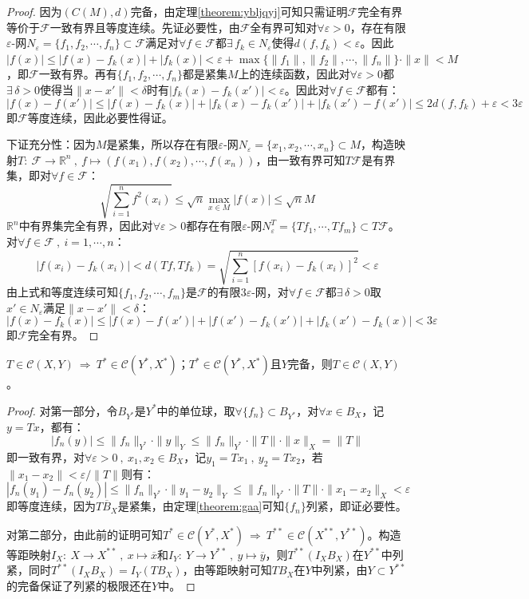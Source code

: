 \begin{proof}
因为$(C(M),d)$完备，由定理\ref{theorem:ybljqyj}可知只需证明$\mathscr{F}$完全有界等价于$\mathscr{F}$一致有界且等度连续。先证必要性，由$\mathscr{F}$全有界可知对$\forall \varepsilon>0$，存在有限$\varepsilon$-网$N_{\varepsilon}=\{f_1,f_2,\cdots,f_n\} \subset \mathscr{F}$满足对$\forall f \in \mathscr{F}$都$\exists \, f_k \in N_{\varepsilon}$使得$d(f,f_k)<\varepsilon$。因此$|f(x)|\leq |f(x)-f_k(x)|+|f_k(x)|<\varepsilon+\max\{\|f_1\|,\|f_2\|,\cdots,\|f_n\|\}\cdot\|x\|<M$，即$\mathscr{F}$一致有界。再有$\{f_1,f_2,\cdots,f_n\}$都是紧集$M$上的连续函数，因此对$\forall \varepsilon>0$都$\exists \, \delta>0$使得当$\|x-x'\|<\delta$时有$|f_k(x)-f_k(x')|<\varepsilon$。因此对$\forall f \in \mathscr{F}$都有：
\[|f(x)-f(x')|\leq|f(x)-f_k(x)|+|f_k(x)-f_k(x')|+|f_k(x')-f(x')|\leq 2d(f,f_k)+\varepsilon<3\varepsilon\]
即$\mathscr{F}$等度连续，因此必要性得证。

下证充分性：因为$M$是紧集，所以存在有限$\varepsilon$-网$N_{\varepsilon}=\{x_1,x_2,\cdots,x_n\} \subset M$，构造映射$T: \ \mathscr{F} \to \mathbb{R}^n \ , \ f \mapsto (f(x_1),f(x_2),\cdots,f(x_n))$，由一致有界可知$T\mathscr{F}$是有界集，即对$\forall f \in \mathscr{F}$：
\[\sqrt{\sum_{i=1}^nf^2(x_i)} \leq \sqrt{n}\max_{x \in M}|f(x)| \leq \sqrt{n}M\]
$\mathbb{R}^n$中有界集完全有界，因此对$\forall \varepsilon>0$都存在有限$\varepsilon$-网$N_{\varepsilon}^T=\{Tf_1,\cdots,Tf_m\} \subset T\mathscr{F}$。对$\forall f \in \mathscr{F} \ , \ i=1,\cdots,n$：
\[|f(x_i)-f_k(x_i)|<d(Tf,Tf_k)=\sqrt{\sum_{i=1}^n[f(x_i)-f_k(x_i)]^2}<\varepsilon\]
由上式和等度连续可知$\{f_1,f_2,\cdots,f_m\}$是$\mathscr{F}$的有限$3\varepsilon$-网，对$\forall f \in \mathscr{F}$都$\exists \, \delta>0 $取$x'\in N_{\varepsilon}$满足$\|x-x'\|<\delta$：
\[|f(x)-f_k(x)|\leq|f(x)-f(x')|+|f(x')-f_k(x')|+|f_k(x')-f_k(x)|<3\varepsilon\]
即$\mathscr{F}$完全有界。
\end{proof}

\begin{theorem}[Schauder 定理]\label{theorem:Schauder}
$T \in \mathscr{C}(X,Y) \ \Rightarrow \ T^* \in \mathscr{C}(Y^*,X^*)$；$T^* \in \mathscr{C}(Y^*,X^*)$且$Y$完备，则$T \in \mathscr{C}(X,Y)$。
\end{theorem}
\begin{proof}
对第一部分，令$B_{Y^*}$是$Y^*$中的单位球，取$\forall \{f_n\} \subset B_{Y^*}$，对$\forall x \in  B_{X}$，记$y=Tx$，都有：
\[|f_n(y)| \leq \|f_n\|_{Y^*}\cdot\|y\|_Y \leq \|f_n\|_{Y^*}\cdot\|T\|\cdot\|x\|_X=\|T\|\]
即一致有界，对$\forall \varepsilon>0 \ , \ x_1,x_2 \in  B_{X}$，记$y_1=Tx_1 \ , \ y_2=Tx_2$，若$\|x_1-x_2\|<\varepsilon/\|T\|$则有：
\[|f_n(y_1)-f_n(y_2)| \leq \|f_n\|_{Y^*}\cdot\|y_1-y_2\|_Y\leq \|f_n\|_{Y^*}\cdot\|T\|\cdot\|x_1-x_2\|_X<\varepsilon\]
即等度连续，因为$\overline{TB_X}$是紧集，由定理\ref{theorem:gaa}可知$\{f_n\}$列紧，即证必要性。

对第二部分，由此前的证明可知$T^* \in \mathscr{C}(Y^*,X^*) \ \Rightarrow \ T^{**} \in \mathscr{C}(X^{**},Y^{**})$。构造等距映射$I_X: \ X \to X^{**} \ , \ x \mapsto \overline{x}$和$I_Y: \ Y \to Y^{**} \ , \ y \mapsto \overline{y}$，则$T^{**}(I_XB_X)$在$Y^{**}$中列紧，同时$T^{**}(I_XB_X)=I_Y(TB_X)$，由等距映射可知$TB_X$在$Y$中列紧，由$Y \subset Y^{**}$的完备保证了列紧的极限还在$Y$中。
\end{proof}
